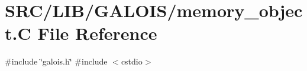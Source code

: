 \hypertarget{memory__object_8_c}{}\section{S\+R\+C/\+L\+I\+B/\+G\+A\+L\+O\+I\+S/memory\+\_\+object.C File Reference}
\label{memory__object_8_c}
{\ttfamily \#include \char`\"{}galois.\+h\char`\"{}}\newline
{\ttfamily \#include $<$cstdio$>$}\newline
